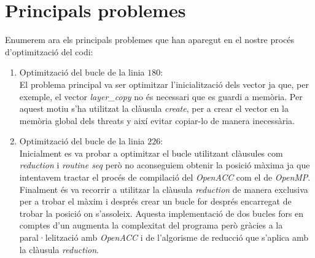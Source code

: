 \documentclass[a4paper, 11pt]{article}
\begin{document}
\section{Principals problemes}
Enumerem ara els principals problemes que han aparegut en el nostre procés d'optimització del codi:
\begin{enumerate}
    \item Optimització del bucle de la linia $180$: \\
    El problema principal va ser optimitzar l'inicialització dels vector ja que, per exemple, el vector \textit{layer\_copy} no és necessari que es guardi a memòria. Per aquest motiu s'ha utilitzat la clàusula \textit{create}, per a crear el vector en la memòria global dels threats y així evitar copiar-lo de manera inecessària.
    \item Optimització del bucle de la linia $226$:\\
    Inicialment es va probar a optimitzar el bucle utilitzant clàusules com \textit{reduction} i \textit{routine seq} però no aconseguiem obtenir la posició màxima ja que intentavem tractar el procés de compilació del \textit{OpenACC} com el de \textit{OpenMP}. Finalment és va recorrir a utilitzar la clàusula \textit{reduction} de manera exclusiva per a trobar el màxim i després crear un bucle for després encarregat de trobar la posició on s'assoleix. Aquesta implementació de dos bucles fors en comptes d'un augmenta la complexitat del programa però gràcies a la paral·lelització amb \textit{OpenACC} i de l'algorisme de reducció que s'aplica amb la clàusula \textit{reduction}.
\end{enumerate}
\end{document}

